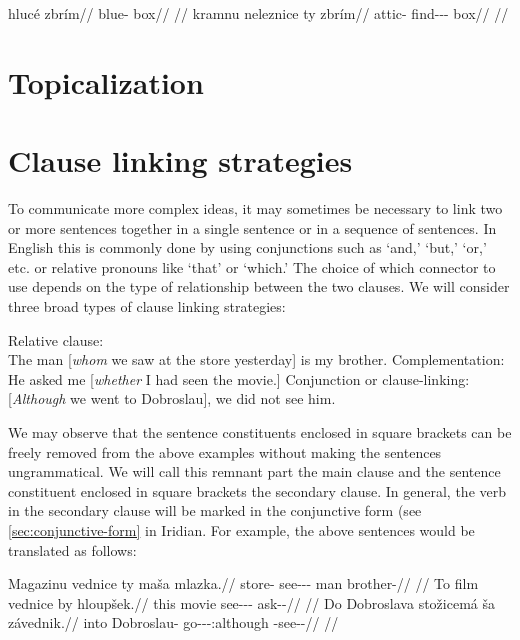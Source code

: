 \pex
\a
  \begingl
  \gla hlucé zbrím//
  \glb blue-\Att{} box//
  \glft {}//
  \endgl
\a
  \begingl
  \gla kramnu neleznice ty zbrím//
  \glb attic-\Ins{} find-\Pv{}-\Pf{}-\Cnj{} \Rel{} box//
  \glft {}//
  \endgl
\xe



\section{Topicalization}\label{sec:topicalization}

\section{Clause linking strategies}\label{sec:clause-linking}

To communicate more complex ideas, it may sometimes be necessary to link two or
more sentences together in a single sentence or in a sequence of sentences. In
English this is commonly done by using conjunctions such as `and,' `but,' `or,'
etc. or relative pronouns like `that' or `which.' The choice of which connector
to use depends on the type of relationship between the two clauses. We will
consider three broad types of clause linking strategies: 

\pex
\a Relative clause:\\
  {The man [\emph{whom} we saw at the store yesterday] is my brother.}
\a Complementation:\\
  {He asked me [\emph{whether} I had seen the movie.]}
\a Conjunction or clause-linking:\\
  {[\emph{Although} we went to Dobroslau], we did not see him.}
\xe

We may observe that the sentence constituents enclosed in square brackets can be
freely removed from the above examples without making the sentences
ungrammatical. We will call this remnant part the {\sc main clause} and the
sentence constituent enclosed in square brackets the {\sc secondary clause}. In
general, the verb in the secondary clause will be marked in the conjunctive form
(see \ref{sec:conjunctive-form} in Iridian. For example, the above sentences
would be translated as follows:

\pex
\a
\begingl
  \gla Magazinu vednice ty maša mlazka.//
  \glb store-\Ins{} see-\Pv{}-\Pf{}-\Cnj{} \Rel{} man brother-\Dim{}//
  \glft {}//
\endgl
\a
\begingl
  \gla To film vednice by hloupšek.//
  \glb this movie see-\Pv{}-\Pf{}-\Cnj{} \Quot{} ask-\Av{}-\Pf{}//
  \glft {}//
\endgl
\a
\begingl
  \gla Do Dobroslava stožicemá ša závednik.//
  \glb into Dobroslau-\Acc{} go-\Av{}-\Pf{}-\Cnj{}:although \Third{}\Sg{} \Neg{}-see-\Pv{}-\Pf{}//
  \glft {}//
\endgl
\xe


